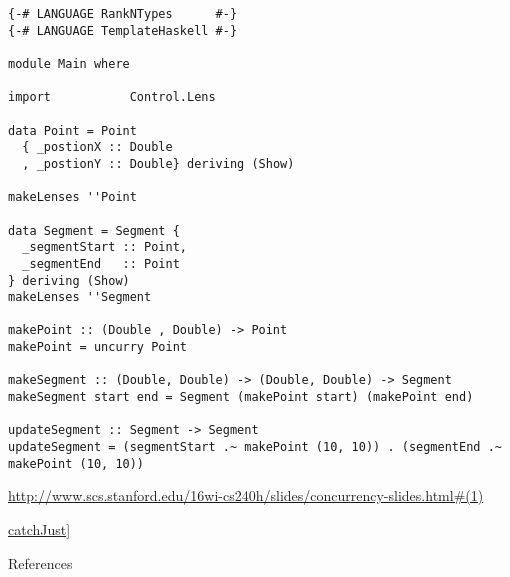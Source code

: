 \begin{verbatim}
{-# LANGUAGE RankNTypes      #-}
{-# LANGUAGE TemplateHaskell #-}

module Main where

import           Control.Lens

data Point = Point
  { _postionX :: Double
  , _postionY :: Double} deriving (Show)

makeLenses ''Point

data Segment = Segment {
  _segmentStart :: Point,
  _segmentEnd   :: Point
} deriving (Show)
makeLenses ''Segment

makePoint :: (Double , Double) -> Point
makePoint = uncurry Point

makeSegment :: (Double, Double) -> (Double, Double) -> Segment
makeSegment start end = Segment (makePoint start) (makePoint end)

updateSegment :: Segment -> Segment
updateSegment = (segmentStart .~ makePoint (10, 10)) . (segmentEnd .~ makePoint (10, 10))
\end{verbatim}



\url{http://www.scs.stanford.edu/16wi-cs240h/slides/concurrency-slides.html#(1)}

\href{https://hackage.haskell.org/package/base-4.10.0.0/docs/Control-Exception.html#v:catchJust}{catchJust]}





References
